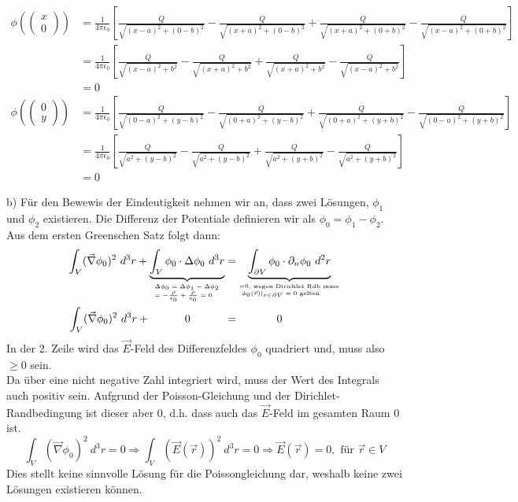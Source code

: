 \documentclass[11pt a4paper]{article}
\newcommand{\epsz}{\epsilon_0}
\newcommand{\kco}{\frac{1}{4\pi\epsilon_0}}
\begin{document}
\begin{align*}
	\phi \left( \begin{pmatrix} x \\ 0 \end{pmatrix} \right) 
	&= \kco \left[
		\frac{Q}{\sqrt{(x-a)^2 + (0-b)^2}}
		- \frac{Q}{\sqrt{(x+a)^2 + (0-b)^2}}
		+ \frac{Q}{\sqrt{(x + a)^2 + (0+b)^2}}
		- \frac{Q}{\sqrt{(x-a)^2 + (0+b)^2}}
	\right] \\
	&= \kco \left[
		\frac{Q}{\sqrt{(x-a)^2 + b^2}}
		- \frac{Q}{\sqrt{(x+a)^2 + b^2}}
		+ \frac{Q}{\sqrt{(x + a)^2 + b^2}}
		- \frac{Q}{\sqrt{(x-a)^2 + b^2}}
	\right] \\
	&= 0 \\
	\phi \left( \begin{pmatrix} 0 \\ y \end{pmatrix} \right) 
	&= \kco \left[
		\frac{Q}{\sqrt{(0-a)^2 + (y-b)^2}}
		- \frac{Q}{\sqrt{(0+a)^2 + (y-b)^2}}
		+ \frac{Q}{\sqrt{(0 + a)^2 + (y+b)^2}}
		- \frac{Q}{\sqrt{(0-a)^2 + (y+b)^2}}
	\right] \\
	&= \kco \left[
		\frac{Q}{\sqrt{a^2 + (y-b)^2}}
		- \frac{Q}{\sqrt{a^2 + (y-b)^2}}
		+ \frac{Q}{\sqrt{a^2 + (y+b)^2}}
		- \frac{Q}{\sqrt{a^2 + (y+b)^2}}
	\right] \\
	&= 0
\end{align*}

\newpage
b) 
Für den Bewewis der Eindeutigkeit nehmen wir an, dass zwei Lösungen,
$\phi_1$ und $\phi_2$ existieren. Die Differenz der Potentiale definieren 
wir als $\phi_0 = \phi_1 - \phi_2$.\\
Aus dem ersten Greenschen Satz folgt dann:
\begin{align*}
	\int_V (\vec \nabla \phi_0)^2 \ d^3r
	+ \underbrace{
		\int_V \phi_0 \cdot \Delta \phi_0 \ d^3 r}_{
		^\text{$\Delta \phi_0 = \Delta \phi_1 - \Delta \phi_2$}
		_\text{$= -\frac{\rho}{\epsz} + \frac{\rho}{\epsz} = 0$}}
	&= 
	\underbrace{\int_{\partial V} \phi_0 \cdot \partial_n \phi_0 \ d^2r}
	_{^{=0 \text{, wegen Dirichlet Rdb muss}}
	_{\text{ $\phi_0(\vec r) \vert_{r\in \partial V} =0$ gelten}}}
	\\
	\int_V (\vec \nabla \phi_0)^2 \ d^3r 
	+ \hspace{1.1cm} 0 \hspace{1.1cm} &= \hspace{1.2cm} 0
\end{align*}
In der 2. Zeile wird das $\vec E$-Feld des Differenzfeldes $\phi_0$ 
quadriert und, muss also $\geq0$ sein. \\
Da über eine nicht negative Zahl integriert wird, muss der Wert des
Integrals auch positiv sein. Aufgrund der Poisson-Gleichung und der 
Dirichlet-Randbedingung ist dieser aber 0, d.h. dass auch das $\vec E$-Feld 
im gesamten Raum 0 ist. \\
\[
	\int_V (\vec \nabla \phi_0)^2 \ d^3r = 0
	\Rightarrow
	\int_V (\vec E(\vec r))^2 \ d^3r = 0
	\Rightarrow
	\vec E (\vec r) = 0, \text{ für } \vec r \in V
\]
Dies stellt keine sinnvolle Lösung für die Poissongleichung dar, weshalb 
keine zwei Lösungen existieren können.
\end{document}
